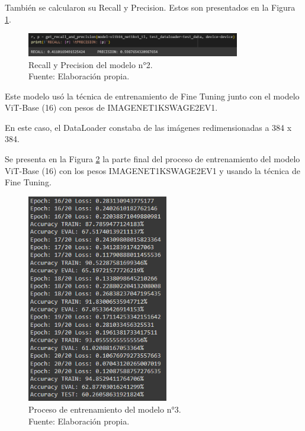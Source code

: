 También se calcularon su Recall y Precision. Estos son presentados en la Figura \ref{4:fig123}.

\begin{figure}[H]
	\begin{center}
		\includegraphics[width=0.83\textwidth]{4/figures/model2_rp.PNG}
		\caption[Recall y Precision del modelo n°2]{Recall y Precision del modelo n°2. \\
		Fuente: Elaboración propia.}
		\label{4:fig123}
	\end{center}
\end{figure}

Este modelo usó la técnica de entrenamiento de Fine Tuning junto con el modelo ViT-Base (16) con pesos de IMAGENET1KSWAGE2EV1.

En este caso, el DataLoader constaba de las imágenes redimensionadas a 384 x 384.

Se presenta en la Figura \ref{4:fig124} la parte final del proceso de entrenamiento del modelo ViT-Base (16) con los pesos  IMAGENET1KSWAGE2EV1 y usando la técnica de Fine Tuning.

\begin{figure}[H]
	\begin{center}
		\includegraphics[width=0.55\textwidth]{4/figures/model3_train.PNG}
		\caption[Proceso de entrenamiento del modelo n°3]{Proceso de entrenamiento del modelo n°3. \\
		Fuente: Elaboración propia.}
		\label{4:fig124}
	\end{center}
\end{figure}

